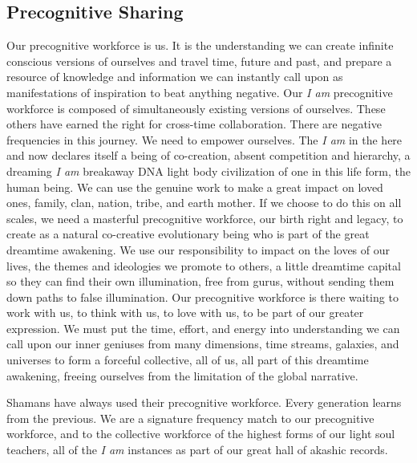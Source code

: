 \subsection{Precognitive Sharing}\label{precognitive-sharing}

Our precognitive workforce is us. It is the understanding we can create
infinite conscious versions of ourselves and travel time, future and
past, and prepare a resource of knowledge and information we can
instantly call upon as manifestations of inspiration to beat anything
negative. Our \emph{I am} precognitive workforce is composed of
simultaneously existing versions of ourselves. These others have earned
the right for cross-time collaboration. There are negative frequencies
in this journey. We need to empower ourselves. The \emph{I am} in the
here and now declares itself a being of co-creation, absent competition
and hierarchy, a dreaming \emph{I am} breakaway DNA light body
civilization of one in this life form, the human being. We can use the
genuine work to make a great impact on loved ones, family, clan, nation,
tribe, and earth mother. If we choose to do this on all scales, we need
a masterful precognitive workforce, our birth right and legacy, to
create as a natural co-creative evolutionary being who is part of the
great dreamtime awakening. We use our responsibility to impact on the
loves of our lives, the themes and ideologies we promote to others, a
little dreamtime capital so they can find their own illumination, free
from gurus, without sending them down paths to false illumination. Our
precognitive workforce is there waiting to work with us, to think with
us, to love with us, to be part of our greater expression. We must put
the time, effort, and energy into understanding we can call upon our
inner geniuses from many dimensions, time streams, galaxies, and
universes to form a forceful collective, all of us, all part of this
dreamtime awakening, freeing ourselves from the limitation of the global
narrative.

Shamans have always used their precognitive workforce. Every generation
learns from the previous. We are a signature frequency match to our
precognitive workforce, and to the collective workforce of the highest
forms of our light soul teachers, all of the \emph{I am} instances as
part of our great hall of akashic records.

